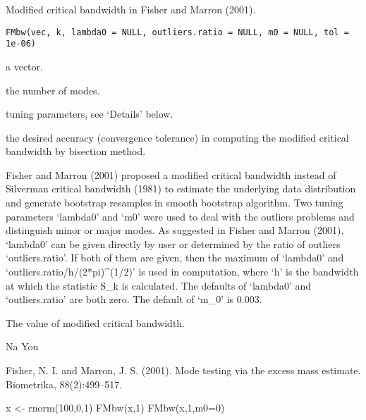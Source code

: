 \begin{Description}\relax
Modified critical bandwidth in Fisher and Marron (2001).
\end{Description}
\begin{Usage}
\begin{verbatim}
FMbw(vec, k, lambda0 = NULL, outliers.ratio = NULL, m0 = NULL, tol = 1e-06)
\end{verbatim}
\end{Usage}
\begin{Arguments}
\begin{ldescription}
\item[\code{vec}] a vector.

\item[\code{k}] the number of modes.

\item[\code{lambda0,outliers.ratio,m0}] tuning parameters, see `Details' below.

\item[\code{tol}] the desired accuracy (convergence tolerance) in computing the
modified critical bandwidth by bisection method.

\end{ldescription}
\end{Arguments}
\begin{Details}\relax
Fisher and Marron (2001) proposed a modified critical bandwidth
instead of Silverman critical bandwidth (1981) to estimate the
underlying data distribution and generate bootstrap resamples in
smooth bootstrap algorithm. Two tuning parameters `lambda0' and `m0'
were used to deal with the outliers problems and distinguish minor or
major modes. As suggested in Fisher and Marron (2001),
`lambda0' can be given directly by
user or determined by the ratio of outliers `outliers.ratio'.
If both of them are given, then the maximum of `lambda0' and
`outliers.ratio/h/(2*pi)\textasciicircum{}(1/2)' is used in computation, where `h' is
the bandwidth at which the statistic S\_k is calculated. The defaults
of `lambda0' and `outliers.ratio' are both zero. The default of `m\_0'
is 0.003.
\end{Details}
\begin{Value}
The value of modified critical bandwidth.
\end{Value}
\begin{Author}\relax
Na You
\end{Author}
\begin{References}\relax
Fisher, N. I. and Marron, J. S. (2001).
Mode testing via the excess mass estimate. Biometrika, 88(2):499--517.
\end{References}
\begin{Examples}
\begin{ExampleCode}
x <- rnorm(100,0,1)
FMbw(x,1)
FMbw(x,1,m0=0)
\end{ExampleCode}
\end{Examples}

